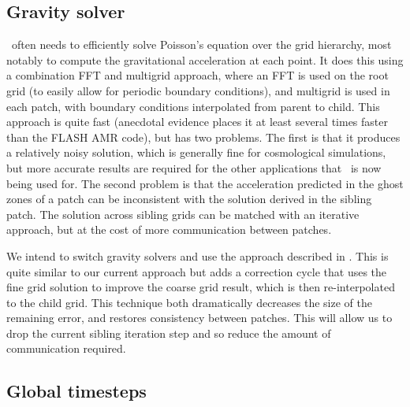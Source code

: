 \documentclass{article}
\begin{document}

\subsection{Gravity solver} \label{issue:method-gravity}


  \enzo\ often needs to efficiently solve Poisson's equation over the
  grid hierarchy, most notably to compute the gravitational
  acceleration at each point.  It does this using a combination FFT
  and multigrid approach, where an FFT is used on the root grid (to
  easily allow for periodic boundary conditions), and multigrid is
  used in each patch, with boundary conditions interpolated from
  parent to child.  This approach is quite fast (anecdotal evidence
  places it at least several times faster than the FLASH AMR code),
  but has two problems.  The first is that it produces a relatively
  noisy solution, which is generally fine for cosmological
  simulations, but more accurate results are required for the other
  applications that \enzo\  is now being used for.  The second problem is
  that the acceleration predicted in the ghost zones of a patch can be
  inconsistent with the solution derived in the sibling patch.  The
  solution across sibling grids can be matched with an iterative
  approach, but at the cost of more communication between patches. 

  We intend to switch gravity solvers and use the approach described
  in \cite{hg00}.  This is quite similar to our current approach but
  adds a correction cycle that uses the fine grid solution to improve
  the coarse grid result, which is then re-interpolated to the child
  grid.  This technique both dramatically decreases the size of the
  remaining error, and restores consistency between patches.  This
  will allow us to drop the current sibling iteration step and so
  reduce the amount of communication required.


\subsection{Global timesteps} \label{issue:method-timestep-global}
\end{document}
